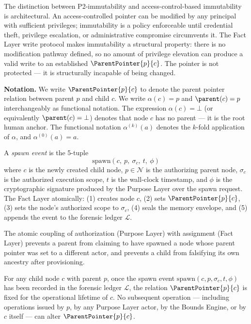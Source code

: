 The distinction between P2-immutability and access-control-based immutability is architectural. An access-controlled pointer can be modified by any principal with sufficient privileges; immutability is a policy enforceable until credential theft, privilege escalation, or administrative compromise circumvents it. The Fact Layer write protocol makes immutability a structural property: there is no modification pathway defined, so no amount of privilege elevation can produce a valid write to an established $\ParentPointer{p}{c}$. The pointer is not protected --- it is structurally incapable of being changed.

\medskip
\noindent\textbf{Notation.} We write $\ParentPointer{p}{c}$ to denote the parent pointer relation between parent $p$ and child $c$. We write $\alpha(c) = p$ and $\parent(c) = p$ interchangeably as functional notation. The expression $\alpha(c) = \bot$ (or equivalently $\parent(c) = \bot$) denotes that node $c$ has no parent --- it is the root human anchor. The functional notation $\alpha^{(k)}(a)$ denotes the $k$-fold application of $\alpha$, and $\alpha^{(0)}(a) = a$.

\begin{dfn}
\label{dfn:spawn-event}
A \emph{spawn event} is the 5-tuple
\begin{equation}
\mathrm{spawn}(c,\ p,\ \sigma_c,\ t,\ \phi)
\end{equation}
where $c$ is the newly created child node, $p \in \mathcal{N}$ is the authorizing parent node, $\sigma_c$ is the authorized execution scope, $t$ is the wall-clock timestamp, and $\phi$ is the cryptographic signature produced by the Purpose Layer over the spawn request. The Fact Layer atomically: (1) creates node $c$, (2) sets $\ParentPointer{p}{c}$, (3) sets the node's authorized scope to $\sigma_c$, (4) seals the memory envelope, and (5) appends the event to the forensic ledger $\mathcal{L}$.
\end{dfn}

The atomic coupling of authorization (Purpose Layer) with assignment (Fact Layer) prevents a parent from claiming to have spawned a node whose parent pointer was set to a different actor, and prevents a child from falsifying its own ancestry after provisioning.

\begin{prop}
\label{prop:parent-pointer-immutable}
For any child node $c$ with parent $p$, once the spawn event $\mathrm{spawn}(c, p, \sigma_c, t, \phi)$ has been recorded in the forensic ledger $\mathcal{L}$, the relation $\ParentPointer{p}{c}$ is fixed for the operational lifetime of $c$. No subsequent operation --- including operations issued by $p$, by any Purpose Layer actor, by the Bounds Engine, or by $c$ itself --- can alter $\ParentPointer{p}{c}$.
\end{prop}

